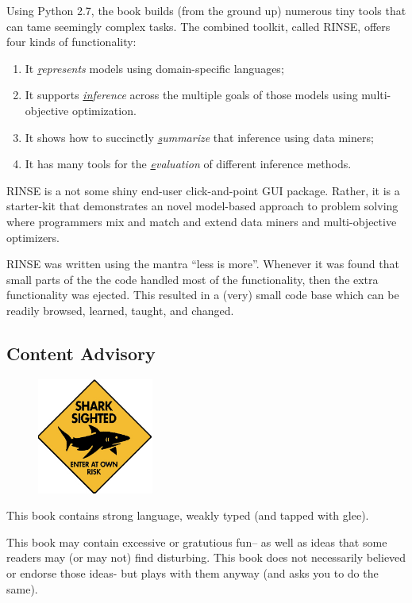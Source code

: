 \documentclass[9pt,twocolumn]{article}
\newcommand{\be}{\begin{enumerate}}
\newcommand{\ee}{\end{enumerate}}
\begin{document}
  Using Python 2.7, the book builds (from the ground up) numerous
  tiny tools that can tame seemingly complex
  tasks. The combined toolkit, called RINSE, offers four kinds of functionality:
  \be
  \item
    It {\em \underline{r}epresents}  models using domain-specific languages;
    \item It supports
    {\em \underline{in}ference} across the multiple goals of those models using multi-objective optimization.
    \item It shows how to succinctly {\em \underline{s}ummarize} that inference  using data miners;
    \item It has  many tools for the
   {\em \underline{e}valuation} of different inference methods. 
   \ee
   
   RINSE is a not some shiny  end-user click-and-point GUI package.
   Rather, it is a starter-kit that demonstrates an novel  model-based approach to problem solving where programmers
   mix and match and extend data miners and multi-objective optimizers.

   RINSE was written using the mantra ``less is more''. Whenever it was found that small parts of the
   the code handled most 
   of the functionality, then the extra functionality was ejected. This resulted in a (very) small code base
   which can be readily browsed, learned, taught, and changed.


   \vfill


   \subsection*{Content Advisory }
\begin{figure}
  \includegraphics[width=1.5in]{img/shark.jpg}
  \end{figure}
This book contains strong language, weakly typed (and tapped with glee).

This book may contain excessive or gratutious fun--
as well as ideas that some readers may (or may not) find disturbing.
This book does not necessarily 
believed or endorse those ideas- but plays with them anyway
(and asks you to do the same).
\end{document}
